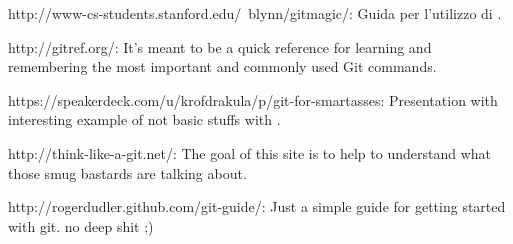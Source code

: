 \link http://www-cs-students.stanford.edu/~blynn/gitmagic/: Guida per l'utilizzo
di .

\link http://gitref.org/: It's meant to be a quick reference for learning and remembering the most important and commonly used Git commands.

\link https://speakerdeck.com/u/krofdrakula/p/git-for-smartasses: Presentation
with interesting example of not basic stuffs with .

\link http://think-like-a-git.net/: The goal of this site is to help to understand what those smug bastards are talking about.

\link http://rogerdudler.github.com/git-guide/: Just a simple guide for getting started with git. no deep shit ;)

\vfill\eject
